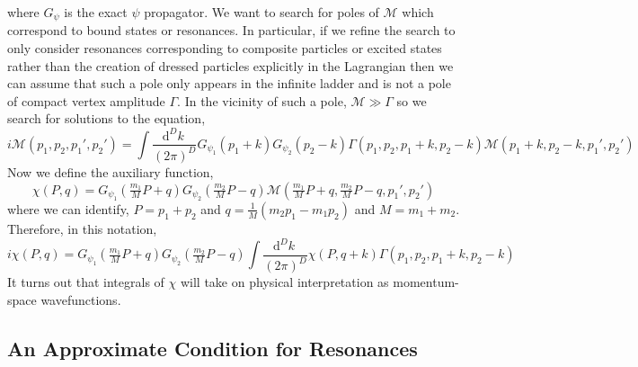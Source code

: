 \documentclass[12pt]{article}
\newcommand{\dn}[2]{ \mathrm{d}^{#1} #2 \:}
\begin{document}
where $G_{\psi}$ is the exact $\psi$ propagator. We want to search for poles of $\mathcal{M}$ which correspond to bound states or resonances. In particular, if we refine the search to only consider resonances corresponding to composite particles or excited states rather than the creation of dressed particles explicitly in the Lagrangian then we can assume that such a pole only appears in the infinite ladder and is not a pole of compact vertex amplitude $\Gamma$. In the vicinity of such a pole, $\mathcal{M} \gg \Gamma$ so we search for solutions to the equation, 
\begin{equation}
i \mathcal{M}(p_1, p_2, p_1', p_2') = \int \frac{\dn{D}{k}}{(2 \pi)^D} G_{\psi_1}(p_1 + k) G_{\psi_2}(p_2 - k) \Gamma(p_1, p_2, p_1 + k, p_2 - k) \mathcal{M}(p_1 + k, p_2 - k, p_1', p_2') 
\end{equation}
Now we define the auxiliary function,
\begin{equation} 
\chi(P, q) = G_{\psi_1}(\tfrac{m_1}{M} P + q) G_{\psi_2}(\tfrac{m_2}{M} P - q) \mathcal{M}(\tfrac{m_1}{M} P + q, \tfrac{m_2}{M} P - q, p_1', p_2') 
\end{equation}
where we can identify, $P = p_1 + p_2$ and $q = \tfrac{1}{M}(m_2 p_1 - m_1 p_2)$ and $M = m_1 + m_2$. Therefore, in this notation,
\begin{equation} 
i \chi(P, q) = G_{\psi_1}(\tfrac{m_1}{M} P + q) G_{\psi_2}(\tfrac{m_2}{M} P - q) \int \frac{\dn{D}{k}}{(2\pi)^D} \chi(P, q + k) \Gamma(p_1, p_2, p_1 + k, p_2 - k) 
\end{equation}
It turns out that integrals of $\chi$ will take on physical interpretation as momentum-space wavefunctions.  

\subsection{An Approximate Condition for Resonances} 
\end{document}
